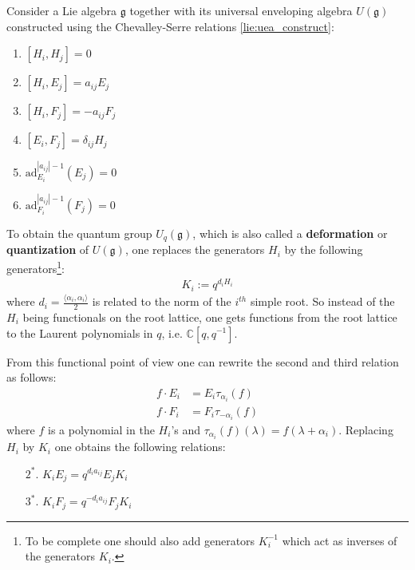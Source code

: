 	\begin{construct}
		Consider a Lie algebra $\mathfrak{g}$ together with its universal enveloping algebra $U(\mathfrak{g})$ constructed using the Chevalley-Serre relations \ref{lie:uea_construct}:
		\begin{enumerate}
			\item $[H_i, H_j] = 0$
        		\item $[H_i, E_j] = a_{ij}E_j$
        		\item $[H_i, F_j] = -a_{ij}F_j$
			\item $[E_i, F_j] = \delta_{ij}H_j$
        		\item $\text{ad}_{E_i}^{|a_{ij}|-1}(E_j) = 0$
        		\item $\text{ad}_{F_i}^{|a_{ij}|-1}(F_j) = 0$
		\end{enumerate}
		 To obtain the quantum group $U_q(\mathfrak{g})$, which is also called a \textbf{deformation} or \textbf{quantization} of $U(\mathfrak{g})$, one replaces the generators $H_i$ by the following generators\footnote{To be complete one should also add generators $K_i^{-1}$ which act as inverses of the generators $K_i$.}:
		\begin{gather}
			K_i := q^{d_iH_i}
		\end{gather}
		where $d_i = \frac{\langle\alpha_i, \alpha_i\rangle}{2}$ is related to the norm of the $i^{th}$ simple root. So instead of the $H_i$ being functionals on the root lattice, one gets functions from the root lattice to the Laurent polynomials in $q$, i.e. $\mathbb{C}[q, q^{-1}]$.
		
		From this functional point of view one can rewrite the second and third relation as follows:
		\begin{align*}
			f\cdot E_i &= E_i\tau_{\alpha_i}(f)\\
			f\cdot F_i &= F_i\tau_{-\alpha_i}(f)
		\end{align*}
		where $f$ is a polynomial in the $H_i$'s and $\tau_{\alpha_i}(f)(\lambda) = f(\lambda+\alpha_i)$. Replacing $H_i$ by $K_i$ one obtains the following relations:
		\begin{enumerate}
			\item[$2^*.$] $K_iE_j = q^{d_ia_{ij}}E_jK_i$
			\item[$3^*.$] $K_iF_j = q^{-d_ia_{ij}}F_jK_i$
		\end{enumerate}
		

\end{construct}
